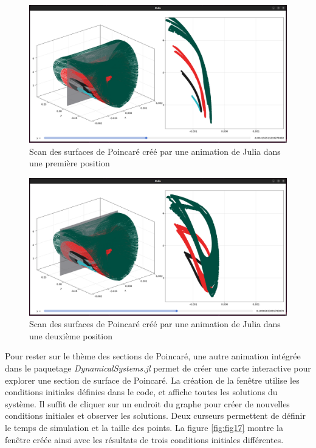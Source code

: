 \documentclass[a4paper, french, 12pt, titlepage]{article}
\begin{document}
\begin{figure}[H]
  \begin{center}
    \includegraphics[width=\linewidth]{poincarescan_0.png}
    \caption{Scan des surfaces de Poincaré créé par une animation de Julia dans une première position}
    \label{fig:fig11}
  \end{center}
\end{figure}

\begin{figure}[H]
  \begin{center}
    \includegraphics[width=\linewidth]{poincarescan_1.png}
    \caption{Scan des surfaces de Poincaré créé par une animation de Julia dans une deuxième position}
    \label{fig:fig12}
  \end{center}
\end{figure}


Pour rester sur le thème des sections de Poincaré, une autre animation intégrée dans le paquetage \emph{DynamicalSystems.jl} permet de créer une carte interactive pour explorer une section de surface de Poincaré.
La création de la fenêtre utilise les conditions initiales définies dans le code, et affiche toutes les solutions du système.
Il suffit de cliquer sur un endroit du graphe pour créer de nouvelles conditions initiales et observer les solutions.
Deux curseurs permettent de définir le temps de simulation et la taille des points.
La figure \ref{fig:fig17} montre la fenêtre créée ainsi avec les résultats de trois conditions initiales différentes. 
\end{document}
